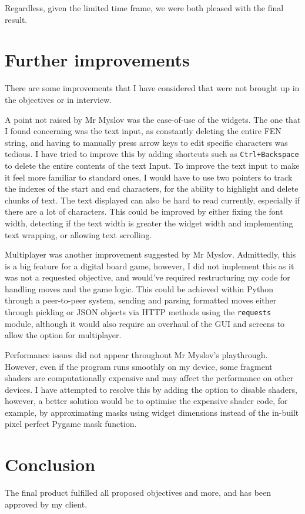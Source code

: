 \documentclass[../main/main.tex]{subfiles}
\begin{document}
\bigskip

\noindent Regardless, given the limited time frame, we were both pleased with the final result.

\section{Further improvements}
There are some improvements that I have considered that were not brought up in the objectives or in interview.

A point not raised by Mr Myslov was the ease-of-use of the widgets. The one that I found concerning was the text input, as constantly deleting the entire FEN string, and having to manually press arrow keys to edit specific characters was tedious. I have tried to improve this by adding shortcuts such as \verb|Ctrl+Backspace| to delete the entire contents of the text Input. To improve the text input to make it feel more familiar to standard ones, I would have to use two pointers to track the indexes of the start and end characters, for the ability to highlight and delete chunks of text. The text displayed can also be hard to read currently, especially if there are a lot of characters. This could be improved by either fixing the font width, detecting if the text width is greater the widget width and implementing text wrapping, or allowing text scrolling.

Multiplayer was another improvement suggested by Mr Myslov. Admittedly, this is a big feature for a digital board game, however, I did not implement this as it was not a requested objective, and would've required restructuring my code for handling moves and the game logic. This could be achieved within Python through a peer-to-peer system, sending and parsing formatted moves either through pickling or JSON objects via HTTP methods using the \lstinline{requests} module, although it would also require an overhaul of the GUI and screens to allow the option for multiplayer.

Performance issues did not appear throughout Mr Myslov's playthrough. However, even if the program runs smoothly on my device, some fragment shaders are computationally expensive and may affect the performance on other devices. I have attempted to resolve this by adding the option to disable shaders, however, a better solution would be to optimise the expensive shader code, for example, by approximating masks using widget dimensions instead of the in-built pixel perfect Pygame mask function.

\section{Conclusion}
The final product fulfilled all proposed objectives and more, and has been approved by my client.
\end{document}
